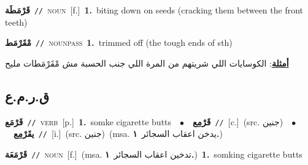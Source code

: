 \documentclass[10pt,a4paper,twoside]{article} %
\begin{document}
\begin{multicols}{2}
{\setlength\topsep{0pt}\textbf{\foreignlanguage{arabic}{قَرْمَطَة}}\ {\color{gray}\texttt{//}\color{black}}\ \textsc{noun}\ [f.]\ \textbf{1.}~biting down on seeds (cracking them between the front teeth)\ } \vspace{2mm}

{\setlength\topsep{0pt}\textbf{\foreignlanguage{arabic}{مْقَرْمَط}}\ {\color{gray}\texttt{//}\color{black}}\ \textsc{noun\textunderscore pass}\ \textbf{1.}~trimmed off (the tough ends of sth)\  \begin{flushright}\color{gray}\foreignlanguage{arabic}{\textbf{\underline{\foreignlanguage{arabic}{أمثلة}}}: الكوسايات اللي شريتهم من المرة اللي جنب الحسبة مش مْقَرْمَطات مليح}\end{flushright}\color{black}} \vspace{2mm}

\vspace{-3mm}
\subsection*{\color{blue}\foreignlanguage{arabic}{ق.ر.م.ع}\color{blue}{}} 

{\setlength\topsep{0pt}\textbf{\foreignlanguage{arabic}{قَرْمَع}}\ {\color{gray}\texttt{//}\color{black}}\ \textsc{verb}\ [p.]\ \textbf{1.}~somke cigarette butts\ \ $\bullet$\ \ \setlength\topsep{0pt}\textbf{\foreignlanguage{arabic}{قَرْمِع}}\ {\color{gray}\texttt{//}\color{black}}\ [c.]\ (src. \color{gray}\foreignlanguage{arabic}{جنين}\color{black})\ \ $\bullet$\ \ \setlength\topsep{0pt}\textbf{\foreignlanguage{arabic}{يقَرْمِع}}\ {\color{gray}\texttt{//}\color{black}}\ [i.]\ (src. \color{gray}\foreignlanguage{arabic}{جنين}\color{black})\ \color{gray}(msa. \foreignlanguage{arabic}{يدخن اعقاب السجائر}~\foreignlanguage{arabic}{\textbf{١.}})\color{black}\ } \vspace{2mm}

{\setlength\topsep{0pt}\textbf{\foreignlanguage{arabic}{قَرْمَعَة}}\ {\color{gray}\texttt{//}\color{black}}\ \textsc{noun}\ [f.]\ \color{gray}(msa. \foreignlanguage{arabic}{تدخين اعقاب السجائر}~\foreignlanguage{arabic}{\textbf{١.}})\color{black}\ \textbf{1.}~somking cigarette butts\ } \vspace{2mm}


\end{multicols}
\end{document}

